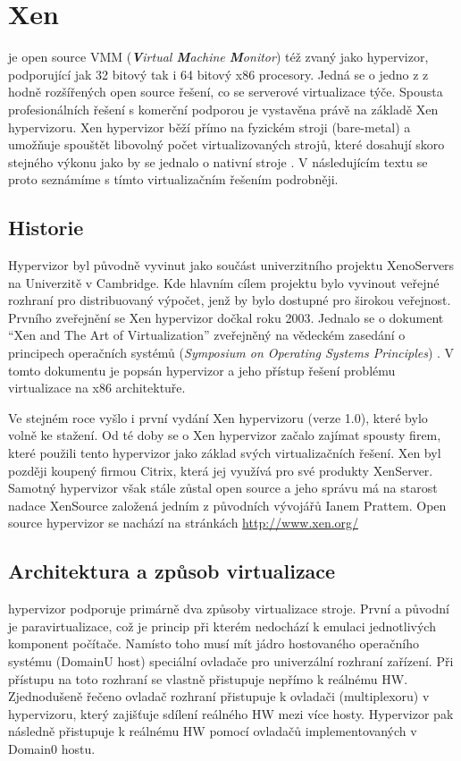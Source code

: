 \section{Xen\textsuperscript{\textregistered}}
\xen je open source VMM (\textit{\textbf{V}irtual \textbf{M}achine \textbf{M}onitor}) též zvaný jako hypervizor, podporující jak 32 bitový tak i 64 bitový x86 procesory. Jedná se o jedno z z hodně rozšířených open source řešení, co se serverové virtualizace týče. Spousta profesionálních řešení s komerční podporou je vystavěna právě na základě Xen hypervizoru. Xen hypervizor běží přímo na fyzickém stroji (bare-metal) a umožňuje spouštět libovolný počet virtualizovaných strojů, které dosahují skoro stejného výkonu jako by se jednalo o nativní stroje \cite{hess:pract}. V následujícím textu se proto seznámíme s tímto virtualizačním řešením podrobněji.

\subsection{Historie}
Hypervizor \xen byl původně vyvinut jako součást univerzitního projektu XenoServers na Univerzitě v Cambridge. Kde hlavním cílem projektu bylo vyvinout veřejné rozhraní pro distribuovaný výpočet, jenž by bylo dostupné pro širokou veřejnost. Prvního zveřejnění se Xen hypervizor dočkal roku 2003. Jednalo se o dokument "`Xen and The Art of Virtualization"' zveřejněný na vědeckém zasedání o principech operačních systémů (\emph{Symposium on Operating Systems Principles}) \cite{xen:sym}. V tomto dokumentu je popsán hypervizor a jeho přístup řešení problému virtualizace na x86 architektuře.

Ve stejném roce vyšlo i první vydání Xen hypervizoru (verze 1.0), které bylo volně ke stažení. Od té doby se o Xen hypervizor začalo zajímat spousty firem, které použili tento hypervizor jako základ svých virtualizačních řešení. Xen byl později koupený firmou Citrix, která jej využívá pro své produkty XenServer. Samotný hypervizor však stále zůstal open source a jeho správu má na starost nadace XenSource založená jedním z původních vývojářů Ianem Prattem. Open source hypervizor se nachází na stránkách \url{http://www.xen.org/ }

\subsection{Architektura a způsob virtualizace}
\xen hypervizor podporuje primárně dva způsoby virtualizace stroje. První a původní je paravirtualizace, což je princip při kterém nedochází k emulaci jednotlivých komponent počítače. Namísto toho musí mít jádro hostovaného operačního systému (DomainU host) speciální ovladače pro univerzální rozhraní zařízení. Při přístupu na toto rozhraní se vlastně přistupuje nepřímo k reálnému HW. Zjednodušeně řečeno ovladač rozhraní přistupuje k ovladači (multiplexoru) v hypervizoru, který zajišťuje sdílení reálného HW mezi více hosty. Hypervizor pak následně přistupuje k reálnému HW pomocí ovladačů implementovaných v Domain0 hostu.

